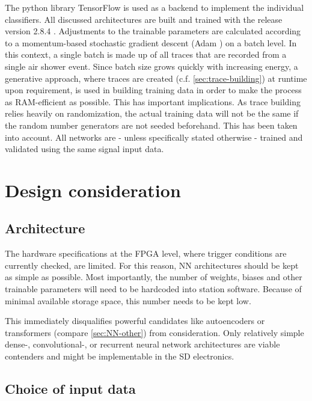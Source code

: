 The python library TensorFlow \cite{tensorflow2015-whitepaper} is used as a backend to implement the individual classifiers. All discussed architectures are built 
and trained with the release version 2.8.4 \cite{tensorflowversion}. Adjustments to the trainable parameters are calculated according to a momentum-based 
stochastic gradient descent (Adam \cite{kingma2014adam}) on a batch level. In this context, a single batch is made up of all traces that are recorded from a single 
air shower event. Since batch size grows quickly with increasing energy, a generative approach, where traces are created (c.f. \autoref{sec:trace-building}) at 
runtime upon requirement, is used in building training data in order to make the process as RAM-efficient as possible. This has important implications. As trace 
building relies heavily on randomization, the actual training data will not be the same if the random number generators are not seeded beforehand. This has been
taken into account. All networks are - unless specifically stated otherwise - trained and validated using the same signal input data.

\section{Design consideration}
\label{sec:design-considerations}

\subsection{Architecture}
\label{ssec:architecture}

The hardware specifications at the FPGA level, where trigger conditions are currently checked, are limited. For this reason, NN architectures should be kept as 
simple as possible. Most importantly, the number of weights, biases and other trainable parameters will need to be hardcoded into station software. Because of 
minimal available storage space, this number needs to be kept low.

This immediately disqualifies powerful candidates like autoencoders or transformers (compare \autoref{sec:NN-other}) from consideration. Only  relatively simple 
dense-, convolutional-, or recurrent neural network architectures are viable contenders and might be implementable in the SD electronics.

\subsection{Choice of input data}
\label{ssec:input-data}

